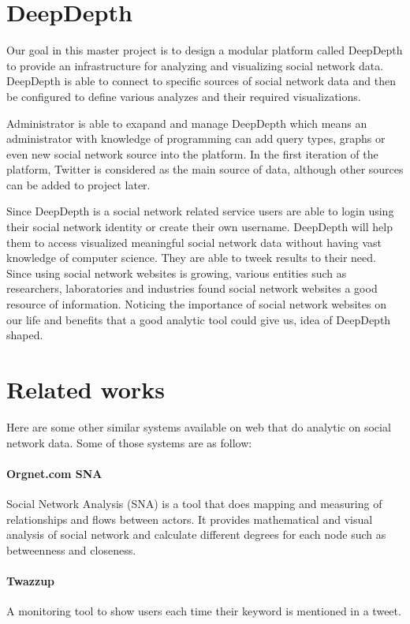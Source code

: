 \documentclass[a4paper,11pt]{report}
\begin{document}
\section{DeepDepth}

Our goal in this master project is to design a modular platform called DeepDepth to provide an infrastructure for analyzing and visualizing social network data. DeepDepth is able to connect to specific sources of social network data and then be configured to define various analyzes and their required visualizations.

Administrator is able to exapand and manage DeepDepth which means an administrator with knowledge of programming can add query types, graphs or even new social network source into the platform. In the first iteration of the platform, Twitter is considered as the main source of data, although other sources can be added to project later.

Since DeepDepth is a social network related service users are able to login using their social network identity or create their own username. DeepDepth will help them to access visualized meaningful social network data without having vast knowledge of computer science. They are able to tweek results to their need. Since using social network websites is growing, various entities such as researchers, laboratories and industries found social network websites a good resource of information. Noticing the importance of social network websites on our life and benefits that a good analytic tool could give us, idea of DeepDepth shaped.

\section{Related works}

Here are some other similar systems available on web that do analytic on social network data. Some of those systems are as follow:

\paragraph{Orgnet.com SNA}
Social Network Analysis (SNA) is a tool that does mapping and measuring of relationships and flows between actors. It provides mathematical and visual analysis of social network and calculate different degrees for each node such as betweenness and closeness.\cite{orgnet}

\paragraph{Twazzup} A monitoring tool to show users each time their keyword is mentioned in a tweet.\cite{twazzup}
\end{document}
